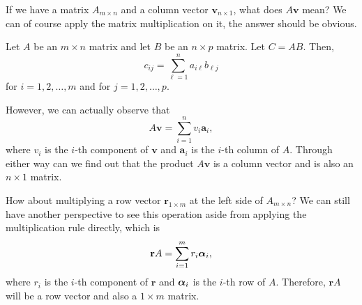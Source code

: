 \documentclass[11pt]{article}
\theoremstyle{break}
\theoremstyle{no_label}
\newcommand{\bfa}{\textbf{a}}
\newcommand{\bfr}{\textbf{r}}
\newcommand{\bfv}{\textbf{v}}
\newcommand{\bfalpha}{\text{\boldmath$\alpha$}}
\numberwithin{equation}{section}
\begin{document}
If we have a matrix $A_{m\times n}$ and a column vector $\bfv_{n\times 1}$, what does $A\bfv$ mean? We can of course apply the matrix multiplication on it, the answer should be obvious.

\begin{definition}
    Let $A$ be an $m\times n$ matrix and let $B$ be an $n\times p$ matrix. Let $C=AB$. Then, $$c_{ij}=\sum_{\ell=1}^{n}a_{i\ell}b_{\ell j}$$ for $i=1,2,\dots,m$ and for $j=1,2,\dots,p$.
\end{definition}

However, we can actually observe that $$A\bfv=\sum_{i=1}^{n} v_i\bfa_i,$$ where $v_i$ is the $i$-th component of $\bfv$ and $\bfa_i$ is the $i$-th column of $A$. Through either way can we find out that the product $A\bfv$ is a column vector and is also an $n\times 1$ matrix.

How about multiplying a row vector $\bfr_{1\times m}$ at the left side of $A_{m\times n}$? We can still have another perspective to see this operation aside from applying the multiplication rule directly, which is $$\bfr A=\sum_{i=1}^{m}r_i\bfalpha_i,$$ where $r_i$ is the $i$-th component of $\bfr$ and $\bfalpha_i$ is the $i$-th row of $A$. Therefore, $\bfr A$ will be a row vector and also a $1\times m$ matrix.
\end{document}
